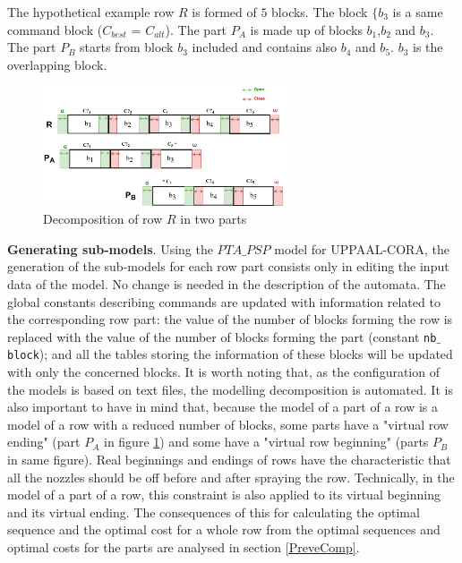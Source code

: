 The hypothetical example row $R$ is formed of $5$ blocks. The block $\{b_{3}$ is a same command block ($C_{best}$ = $C_{alt}$). The part $P_{A}$ is made up of blocks $b_{1}$,$b_{2}$ and $b_{3}$. The part $ P_{B} $ starts from block $b_{3}$ included and contains also $b_{4}$ and $b_{5}$. $b_{3}$ is the overlapping block.

\begin{figure}[h!]
	\begin{center}
		\includegraphics[width=7.2cm]{decompo2.pdf} 
		\caption{Decomposition of row $R$ in two parts} 
		\label{fig:decompo_in_two}
	\end{center}
\end{figure} 

\textbf{Generating sub-models}. Using the $PTA\_PSP$ model for UPPAAL-CORA, the generation of the sub-models for each row part consists only in editing the input data of the model. No change is needed in the description of the automata. The global constants describing commands are updated with information related to the corresponding row part: the value of the number of blocks forming the row is replaced with the value of the number of blocks forming the part (constant \texttt{nb$\_$block}); and all the tables storing the information of these blocks will be updated with only the concerned blocks.
It is worth noting that, as the configuration of the models is based on text files, the modelling decomposition is automated. It is also important to have in mind that, because the model of a part of a row is a model of a row with a reduced number of blocks, some parts have a "virtual row ending" (part $P_A$ in figure \ref{fig:decompo_in_two}) and some have a "virtual row beginning" (parts $P_B$ in same figure). Real beginnings and endings of rows have the characteristic that all the nozzles should be off before and after spraying the row. Technically, in the model of a part of a row, this constraint is also applied to its virtual beginning and its virtual ending. The consequences of this for calculating the optimal sequence and the optimal cost for a whole row from the optimal sequences and optimal costs for the parts are analysed in section \ref{PreveComp}.


